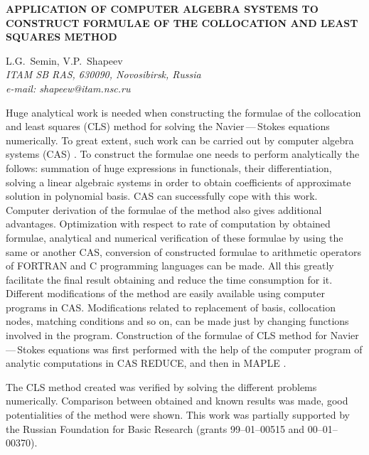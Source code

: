 \documentclass[12pt]{article}
\begin{document}
\begin{center}
{\bf APPLICATION OF COMPUTER ALGEBRA SYSTEMS TO CONSTRUCT FORMULAE OF THE
COLLOCATION AND LEAST SQUARES METHOD}\\
\vspace {4mm}

L.G.~Semin, V.P.~Shapeev\\
{\it \small ITAM SB RAS, 630090, Novosibirsk, Russia\\
e-mail: shapeew@itam.nsc.ru}
\end{center}
\vspace {6mm}

Huge analytical work is needed when constructing the formulae of the
collocation and least squares (CLS) method for solving the Navier\,---\,Stokes
equations numerically.  To great extent, such work can be carried out by
computer algebra systems (CAS) \cite{bk:val, bk:sha}.  To construct the
formulae one needs to perform analytically the follows: summation of huge
expressions in functionals, their differentiation, solving a linear algebraic
systems in order to obtain coefficients of approximate solution in polynomial
basis.  CAS can successfully cope with this work.  Computer derivation of the
formulae of the method also gives additional advantages.  Optimization with
respect to rate of computation by obtained formulae, analytical and numerical
verification of these formulae by using the same or another CAS, conversion of
constructed formulae to arithmetic operators of FORTRAN and C programming
languages can be made.  All this greatly facilitate the final result obtaining
and reduce the time consumption for it.  Different modifications of the method
are easily available using computer programs in CAS.  Modifications related to
replacement of basis, collocation nodes, matching conditions  and so on, can
be made just by changing functions involved in the program.  Construction of
the formulae of CLS method for Navier\,---\,Stokes equations was first
performed with the help of the computer program of analytic computations in
CAS REDUCE, and then in MAPLE \cite{bk:sha, bk:semin, bk:hungary}.

The CLS method created was verified by solving the different problems
numerically.  Comparison between obtained and known results was made, good
potentialities of the method were shown.  This work was partially supported
by the Russian Foundation for Basic Research (grants 99--01--00515 and
00--01--00370).
\end{document}
